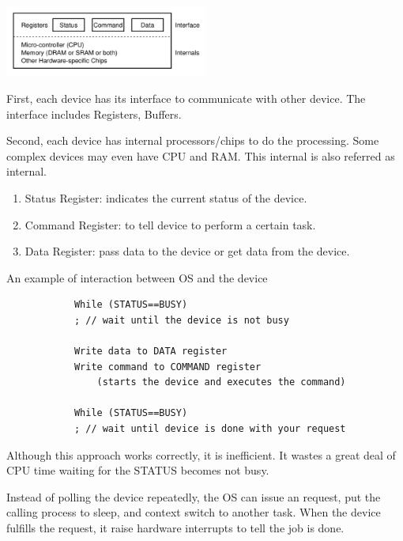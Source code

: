 
        \includegraphics[width=0.5\textwidth]{chapters/Persistence/persistence/canonical_device.png}

        First, each device has its interface to communicate with other device. The interface includes 
        Registers, Buffers.
        
        Second, each device has internal processors/chips to do the processing. Some complex devices 
        may even have CPU and RAM. This internal is also referred as internal. 


        \begin{enumerate}
            \item Status Register: indicates the current status of the device.
            \item Command Register: to tell device to perform a certain task.
            \item Data Register: pass data to the device or get data from the device.
        \end{enumerate}

        An example of interaction between OS and the device 
        \begin{lstlisting}
            While (STATUS==BUSY)
            ; // wait until the device is not busy

            Write data to DATA register
            Write command to COMMAND register 
                (starts the device and executes the command)

            While (STATUS==BUSY)
            ; // wait until device is done with your request
        \end{lstlisting}


        Although this approach works correctly, it is inefficient. It wastes a great deal of 
        CPU time waiting for the STATUS becomes not busy.
    

        Instead of polling the device repeatedly, the OS can issue an request, put the calling process 
        to sleep, and context switch to another task. When the device fulfills the request,
        it raise hardware interrupts to tell the job is done.

